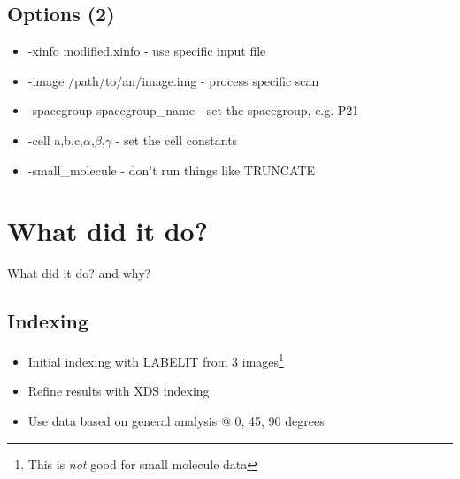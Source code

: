 \documentclass[a4paper, 11pt]{article}
\begin{document}
\subsection{Options (2)}
\begin{itemize}
\item{-xinfo modified.xinfo - use specific input file}
\item{-image /path/to/an/image.img - process specific scan}
\item{-spacegroup spacegroup\_name - set the spacegroup, e.g. P21}
\item{-cell a,b,c,$\alpha$,$\beta$,$\gamma$ - set the cell constants} 
\item{-small\_molecule - don't run things like TRUNCATE}
\end{itemize}

\section{What did it do?}

\begin{center}
\Huge What did it do? and why?
\end{center}

\subsection{Indexing}
\begin{itemize}
\item{Initial indexing with LABELIT from 3 images\footnote{This is \emph{not}
good for small molecule data}}
\item{Refine results with XDS indexing}
\item{Use data based on general analysis @ 0, 45, 90 degrees}
\end{itemize}
\end{document}
